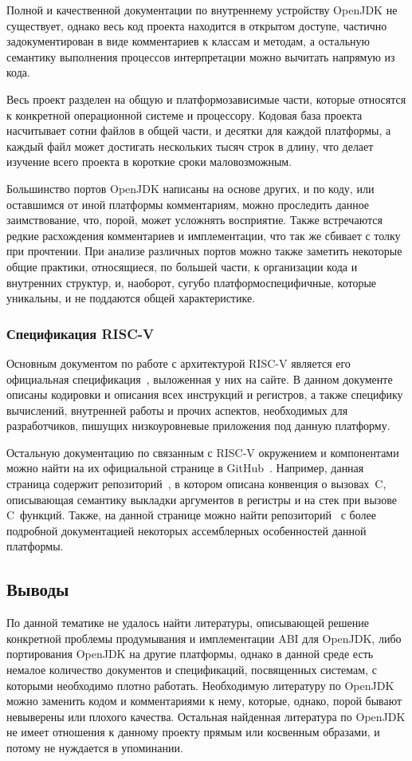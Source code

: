 Полной и качественной документации по внутреннему устройству OpenJDK не существует, однако весь код проекта находится в открытом доступе, частично задокументирован в виде комментариев к классам и методам, а остальную семантику выполнения процессов интерпретации можно вычитать напрямую из кода\cite{hotspot}.

Весь проект разделен на общую и платформозависимые части, которые относятся к конкретной операционной системе и процессору. Кодовая база проекта насчитывает сотни файлов в общей части, и десятки для каждой платформы, а каждый файл может достигать нескольких тысяч строк в длину, что делает изучение всего проекта в короткие сроки маловозможным.

Большинство портов OpenJDK написаны на основе других, и по коду, или оставшимся от иной платформы комментариям, можно проследить данное заимствование, что, порой, может усложнять восприятие. Также встречаются редкие расхождения комментариев и имплементации, что так же сбивает с толку при прочтении. При анализе различных портов можно также заметить некоторые общие практики, относящиеся, по большей части, к организации кода и внутренних структур, и, наоборот, сугубо платформоспецифичные, которые уникальны, и не поддаются общей характеристике.


\subsubsection*{Спецификация RISC-V}

Основным документом по работе с архитектурой RISC-V является его официальная спецификация~\cite{riscv:spec}, выложенная у них на сайте. В данном документе описаны кодировки и описания всех инструкций и регистров, а также специфику вычислений, внутренней работы и прочих аспектов, необходимых для разработчиков, пишущих низкоуровневые приложения под данную платформу. 

Остальную документацию по связанным с RISC-V окружением и компонентами можно найти на их официальной странице в GitHub~\cite{riscv:github}. Например, данная страница содержит репозиторий~\cite{riscv:convention}, в котором описана конвенция о вызовах~C, описывающая семантику выкладки аргументов в регистры и на стек при вызове C~функций. Также, на данной странице можно найти репозиторий~\cite{riscv:asm} с более подробной документацией некоторых ассемблерных особенностей данной платформы.


\subsection*{Выводы}

По данной тематике не удалось найти литературы, описывающей решение конкретной проблемы продумывания и имплементации ABI для OpenJDK, либо портирования OpenJDK на другие платформы, однако в данной среде есть немалое количество документов и спецификаций, посвященных системам, с которыми необходимо плотно работать. Необходимую литературу по OpenJDK можно заменить кодом и комментариями к нему, которые, однако, порой бывают невыверены или плохого качества. Остальная найденная литература по OpenJDK не имеет отношения к данному проекту прямым или косвенным образами, и потому не нуждается в упоминании.
